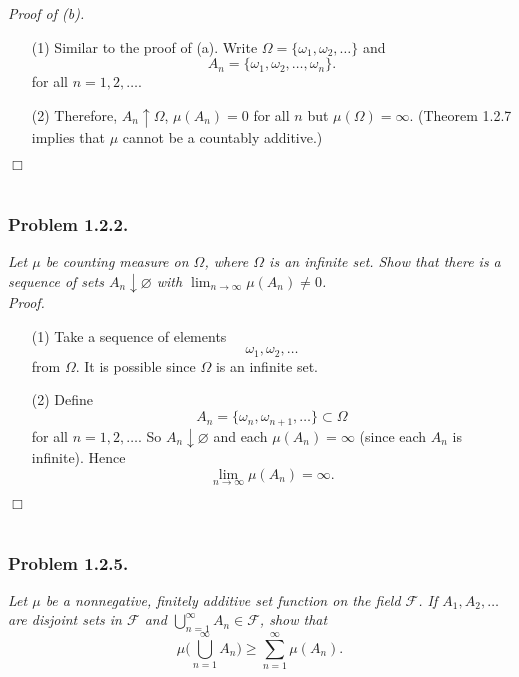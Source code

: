 \documentclass{article}
\begin{document}
\emph{Proof of (b).}
\begin{enumerate}
\item[(1)]
  Similar to the proof of (a).
  Write $\Omega = \{ \omega_1, \omega_2, \ldots \}$ and
  \[
    A_n = \{ \omega_1, \omega_2, \ldots, \omega_n \}.
  \]
  for all $n = 1, 2, \ldots$.

\item[(2)]
  Therefore, $A_n \uparrow \Omega$, $\mu(A_n) = 0$ for all $n$ but $\mu(\Omega) = \infty$.
  (Theorem 1.2.7 implies that $\mu$ cannot be a countably additive.)
\end{enumerate}
$\Box$ \\\\






\subsubsection*{Problem 1.2.2.}
\emph{Let $\mu$ be counting measure on $\Omega$,
where $\Omega$ is an infinite set.
Show that there is a sequence of sets $A_n \downarrow \varnothing$ with
$\lim_{n \to \infty} \mu(A_n) \neq 0$.} \\



\emph{Proof.}
\begin{enumerate}
\item[(1)]
  Take a sequence of elements
  \[
    \omega_1, \omega_2, \ldots
  \]
  from $\Omega$.
  It is possible since $\Omega$ is an infinite set.

\item[(2)]
  Define
  \[
    A_n = \{ \omega_n, \omega_{n+1}, \ldots \} \subset \Omega
  \]
  for all $n = 1, 2, \ldots$.
  So $A_n \downarrow \varnothing$ and each $\mu(A_n) = \infty$
  (since each $A_n$ is infinite).
  Hence
  \[
    \lim_{n \to \infty} \mu(A_n) = \infty.
  \]
\end{enumerate}
$\Box$ \\\\






\subsubsection*{Problem 1.2.5.}
\emph{Let $\mu$ be a nonnegative,
finitely additive set function on the field $\mathscr{F}$.
If $A_1, A_2, \ldots$ are disjoint sets in $\mathscr{F}$
and $\bigcup_{n=1}^{\infty} A_n \in \mathscr{F}$, show that}
\[
  \mu \Bigg( \bigcup_{n=1}^{\infty} A_n \Bigg)
  \geq
  \sum_{n=1}^{\infty} \mu(A_n).
\] \\
\end{document}
